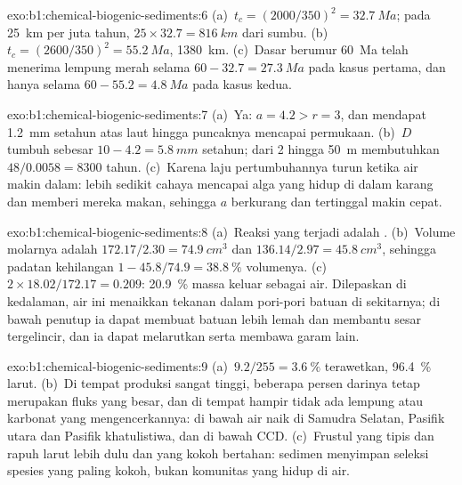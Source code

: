 \begin{solution}{exo:b1:chemical-biogenic-sediments:6}
(a)~$t_c = (2000/350)^2 = \qty{32.7}{Ma}$; pada \qty{25}{km} per juta tahun,
$25\times32.7 = \qty{816}{km}$ dari sumbu. (b)~$t_c = (2600/350)^2 =
\qty{55.2}{Ma}$, \qty{1380}{km}. (c)~Dasar berumur \qty{60}{Ma} telah menerima
lempung merah selama $60 - 32.7 = \qty{27.3}{Ma}$ pada kasus pertama, dan hanya
selama $60 - 55.2 = \qty{4.8}{Ma}$ pada kasus kedua.
\end{solution}

\begin{solution}{exo:b1:chemical-biogenic-sediments:7}
(a)~Ya: $a = 4.2 > r = 3$, dan  mendapat \qty{1.2}{mm} setahun atas laut hingga
puncaknya mencapai permukaan. (b)~$D$ tumbuh sebesar $10 - 4.2 = \qty{5.8}{mm}$ setahun;
dari 2 hingga \qty{50}{m} membutuhkan $48/0.0058 = \num{8300}$ tahun. (c)~Karena laju
pertumbuhannya turun ketika air makin dalam: lebih sedikit cahaya mencapai alga yang
hidup di dalam karang dan memberi mereka makan, sehingga $a$ berkurang dan 
tertinggal makin cepat.
\end{solution}

\begin{solution}{exo:b1:chemical-biogenic-sediments:8}
(a)~Reaksi yang terjadi adalah . (b)~Volume molarnya adalah
$172.17/2.30 =
\qty{74.9}{cm^3}$ dan $136.14/2.97 = \qty{45.8}{cm^3}$, sehingga padatan kehilangan
$1 - 45.8/74.9 = \qty{38.8}{\%}$ volumenya. (c)~$2\times18.02/172.17 = 0.209$:
\qty{20.9}{\%} massa keluar sebagai air. Dilepaskan di kedalaman, air ini menaikkan
tekanan dalam pori-pori batuan di sekitarnya; di bawah penutup ia dapat membuat batuan
lebih lemah dan membantu sesar tergelincir, dan ia dapat melarutkan serta membawa garam lain.
\end{solution}

\begin{solution}{exo:b1:chemical-biogenic-sediments:9}
(a)~$9.2/255 = \qty{3.6}{\%}$ terawetkan, \qty{96.4}{\%} larut. (b)~Di tempat produksi
sangat tinggi, beberapa persen darinya tetap merupakan fluks yang besar, dan di tempat
hampir tidak ada lempung atau karbonat yang mengencerkannya: di bawah air naik di
Samudra Selatan, Pasifik utara dan Pasifik khatulistiwa, dan di bawah CCD. (c)~Frustul
yang tipis dan rapuh larut lebih dulu dan yang kokoh bertahan: sedimen menyimpan seleksi
spesies yang paling kokoh, bukan komunitas yang hidup di air.
\end{solution}

